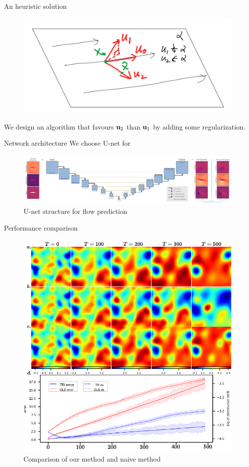 \documentclass[NUS-Kajima workshop]{beamer}
\begin{document}
\begin{frame}{An heuristic solution}
	\begin{figure}[H]
		\centering
		\centerline{\includegraphics[width=0.9\linewidth]{fig/mfd.png}}
	  \end{figure}
	  We design an algorithm that favours $\mathbf{u}_2$ than $\mathbf{u}_1$ by adding some regularization.
\end{frame}

\begin{frame}{Network architecture}
	We choose U-net for 
	\begin{figure}[H]
          \centering
          \centerline{\includegraphics[width=1.1\linewidth]{fig/Unet.png}}
          \caption{U-net structure for flow prediction\footnotemark}
\end{figure}
\end{frame}

\begin{frame}{Performance comparison}
	\begin{figure}[H]
          \centering
          \centerline{\includegraphics[width=.7\linewidth]{fig/RD-TR.pdf}}
          \caption{Comparison of our method and naive method}
\end{figure}
\end{frame}
\end{document}
